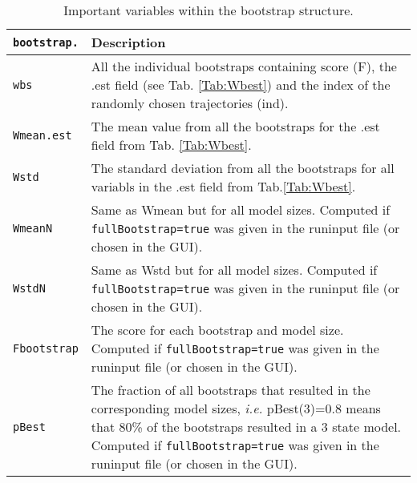 \begin{table}[ht]
\caption{Important variables within the bootstrap structure.} 
\centering 
\begin{tabular*}{13.1cm}{ | m{2.7cm} | m{9.5cm} | } 
\hline
\texttt{bootstrap.} 			& \textbf{Description} \\ [0.5ex] 
\hline\hline 
\texttt{wbs} 						& All the individual bootstraps containing score (F), the .est field (see Tab. \ref{Tab:Wbest}) and the index of the randomly chosen trajectories (ind).\\[0.5ex]   \hline 
\texttt{Wmean.est}  						& The mean value from all the bootstraps for the .est field from Tab. \ref{Tab:Wbest}.\\[0.5ex]  \hline 
\texttt{Wstd}				 	& The standard deviation from all the bootstraps for all variabls in the .est field from Tab.\ref{Tab:Wbest}.\\[0.5ex]  \hline \hline
\texttt{WmeanN}				& Same as Wmean but for all model sizes. Computed if \texttt{fullBootstrap=true} was given in the runinput file (or chosen in the GUI).\\[0.5ex]  \hline 
\texttt{WstdN}					& Same as Wstd but for all model sizes. Computed if \texttt{fullBootstrap=true} was given in the runinput file (or chosen in the GUI).\\[0.5ex]  \hline 
\texttt{Fbootstrap}			& The score for each bootstrap and model size. Computed if \texttt{fullBootstrap=true} was given in the runinput file (or chosen in the GUI).\\[0.5ex]  \hline 
\texttt{pBest}					& The fraction of all bootstraps that resulted in the corresponding model sizes, \textit{i.e.} pBest(3)=0.8 means that 80\% of the bootstraps resulted in a 3 state model. Computed if \texttt{fullBootstrap=true} was given in the runinput file (or chosen in the GUI).\\[1ex] %
\hline 
\end{tabular*}\label{Tab:bootstrap} 
\end{table}


\newpage
